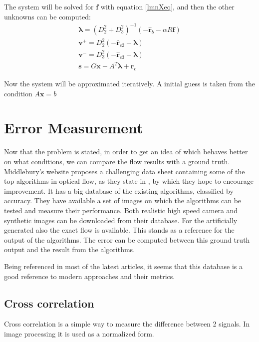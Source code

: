\documentclass[12pt,a4paper,twoside]{report}
\begin{document}
 The system will be solved for $\boldsymbol{f}$ with equation  \ref{lmnXeq}, and then the other unknowns can be computed:
 \begin{equation}
 	\begin{split}
 	\boldsymbol{\lambda} = ( D_2^{2} +  D_3^{2} )^{-1}
 	(-\hat{\boldsymbol{r}}_{b} - \alpha R \boldsymbol{f})\\
 	\boldsymbol{v}^+ = D_2^{2}(-\hat{\boldsymbol{r}}_{c2} - \boldsymbol{\lambda})\\
	\boldsymbol{v}^- = D_3^{2}(-\hat{\boldsymbol{r}}_{c3} + \boldsymbol{\lambda})\\
 	\boldsymbol{s} =  G  \boldsymbol{x} -  A^T\boldsymbol{\lambda} + \boldsymbol{r}_c
 	\end{split}
 \end{equation}
 
 Now the system will be approximated iteratively. A initial guess is taken from the condition $A\boldsymbol{x} = b$ 




\section{Error Measurement}
Now that the problem is stated, in order to get an idea of which behaves better on what conditions, we can compare the flow results with a ground truth. Middlebury's website\cite{middleburry} proposes a challenging data sheet containing some of the top algorithms in optical flow, as they state in \cite{baker2011database}, by which they hope to encourage improvement. It \cite{middleburry} has a big database of the existing algorithms, classified by accuracy.
They have available a set of images on which the algorithms can be tested and measure their performance. Both realistic high speed camera and synthetic images can be downloaded from their database. For the artificially generated also the exact flow is available. This stands as a reference for the output of the algorithms. The error can be computed between this ground truth output and the result from the algorithms.

 Being referenced in most of the latest articles, it seems that this database is a good reference to modern approaches and their metrics.

\subsection{Cross correlation}

Cross correlation is a simple way to measure the difference between 2 signals. In image processing it is used as a normalized form. 
\end{document}

